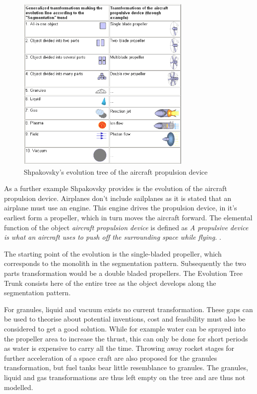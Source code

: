 \documentclass[11pt,a4paper]{article}
\begin{document}
\begin{figure}[htb]
  \centering
  \includegraphics[width=0.75\textwidth]{figures/aircraft.png}
  \caption{\small Shpakovsky's evolution tree of the aircraft propulsion
    device \cite{Shpakovsky2003}}
	\label{fig:aircraft}
\end{figure}

As a further example Shpakovsky provides is the evolution of the aircraft
propulsion device. Airplanes don't include sailplanes as it is stated that an
airplane must use an engine. This engine drives the propulsion device, in it's
earliest form a propeller, which in turn moves the aircraft forward. The
elemental function of the object \textit{aircraft propulsion device} is
defined as \textit{A propulsive device is what an aircraft uses to push off
  the surrounding space while flying.} \cite{Shpakovsky2003}.

The starting point of the evolution is the single-bladed propeller, which
corresponds to the monolith in the segmentation pattern. Subsequently the two
parts transformation would be a double bladed propellers. The Evolution Tree
Trunk consists here of the entire tree as the object develops along the
segmentation pattern.

For granules, liquid and vacuum exists no current transformation. These gaps
can be used to theorise about potential inventions, cost and feasibility must
also be considered to get a good solution. While for example water can be
sprayed into the propeller area to increase the thrust, this can only be done
for short periods as water is expensive to carry all the time. Throwing away
rocket stages for further acceleration of a space craft are also proposed for
the granules transformation, but fuel tanks bear little resemblance to
granules. The granules, liquid and gas transformations are thus left empty on
the tree and are thus not modelled. 
\end{document}
